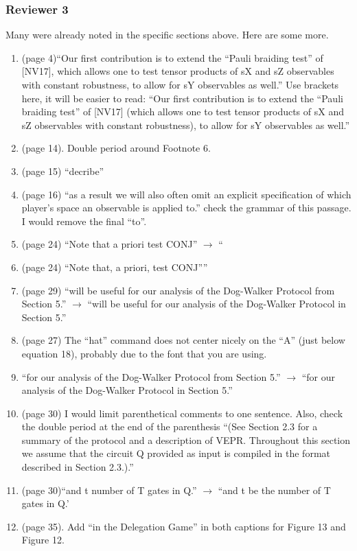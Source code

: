 \documentclass[12pt]{article}
\begin{document}
\subsubsection*{Reviewer 3  }
Many were already noted in the specific sections above. Here are some more.
\begin{enumerate}
\item (page 4)``Our first contribution is to extend the “Pauli braiding test” of [NV17], which allows one to test tensor
products of sX and sZ observables with constant robustness, to allow for sY observables as well.'' Use brackets here, it will be easier to read:
``Our first contribution is to extend the “Pauli braiding test” of [NV17] (which allows one to test tensor
products of sX and sZ observables with constant robustness), to allow for sY observables as well.''
\item (page 14). Double period around Footnote 6.
\item (page 15) ``decribe''
\item (page 16) ``as a result we will also often omit an
explicit specification of which player’s space an observable is applied to.'' check the grammar of this passage. I would remove the final ``to''.
   \item (page 24) ``Note that
a priori test CONJ'' $\rightarrow$ ``   \item (page 24) ``Note that,
a priori, test CONJ''''
\item (page 29) ``will be useful for our analysis of the Dog-Walker Protocol from Section 5.'' $\rightarrow$ ``will be useful for our analysis of the Dog-Walker Protocol in Section 5.''
\item (page 27) The ``hat'' command does not center nicely on the ``A'' (just below equation 18), probably due to the font that you are using.
\item ``for our analysis of the Dog-Walker Protocol from Section 5.'' $\rightarrow$ ``for our analysis of the Dog-Walker Protocol in Section 5.''
\item (page 30) I would limit parenthetical comments to one sentence. Also, check the double period at the end of the parenthesis ``(See Section 2.3 for a summary of the protocol and a description of VEPR. Throughout this section we
assume that the circuit Q provided as input is compiled in the format described in Section 2.3.).''
\item (page 30)``and t number
of T gates in Q.'' $\rightarrow$ ``and t be the number
of T gates in Q.'
\item (page 35). Add ``in the Delegation Game'' in both captions for Figure 13 and Figure 12.

\end{enumerate}
\end{document}
